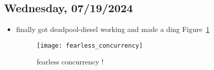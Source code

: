 \subsection*{Wednesday, 07/19/2024}
\begin{itemize}
    \item finally got deadpool-diesel working and made a ding
        Figure~\ref{fig:fearless_concurrency}
        \begin{figure}[ht]
            \centering
            \texttt{[image: fearless\_concurrency]}
            \captionsetup{labelfont=bf, textfont=it}
            \caption{fearless concurrency !}
            \label{fig:fearless_concurrency}
        \end{figure}
\end{itemize}
